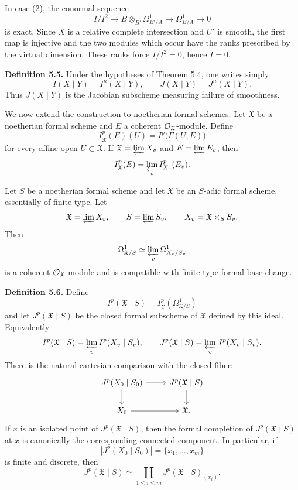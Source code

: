 \documentclass[11pt]{article}
\begin{document}
In case (2), the conormal sequence
\[
        I/I^2\longrightarrow
        B\otimes_{B'}\Omega^1_{B'/A}
        \longrightarrow
        \Omega^1_{B/A}\longrightarrow 0
\]
is exact.  Since \(X\) is a relative complete intersection and \(U'\) is smooth, the first map is injective and the two modules which occur have the ranks prescribed by the virtual dimension.  These ranks force \(I/I^2=0\), hence \(I=0\).

\textbf{Definition 5.5.}  Under the hypotheses of Theorem 5.4, one writes simply
\[
        I(X\mid Y)=I^n(X\mid Y),\qquad
        J(X\mid Y)=J^n(X\mid Y).
\]
Thus \(J(X\mid Y)\) is the Jacobian subscheme measuring failure of smoothness.

We now extend the construction to noetherian formal schemes.  Let \(\mathfrak X\) be a noetherian formal scheme and \(E\) a coherent \(\mathcal O_{\mathfrak X}\)-module.  Define
\[
        I^p_{\mathfrak X}(E)(U)=I^p\bigl(\Gamma(U,E)\bigr)
\]
for every affine open \(U\subset\mathfrak X\).  If \(\mathfrak X=\varprojlim X_v\) and \(E=\varprojlim E_v\), then
\[
        I^p_{\mathfrak X}(E)=\varprojlim_v I^p_{X_v}(E_v).
\]

Let \(S\) be a noetherian formal scheme and let \(\mathfrak X\) be an \(S\)-adic formal scheme, essentially of finite type.  Let
\[
        \mathfrak X=\varprojlim X_v,\qquad S=\varprojlim S_v,\qquad
        X_v=\mathfrak X\times_S S_v.
\]
Then
\[
        \Omega^1_{\mathfrak X/S}\simeq \varprojlim_v\Omega^1_{X_v/S_v}
\]
is a coherent \(\mathcal O_{\mathfrak X}\)-module and is compatible with finite-type formal base change.

\textbf{Definition 5.6.}  Define
\[
        I^p(\mathfrak X\mid S)=I^p_{\mathfrak X}(\Omega^1_{\mathfrak X/S})
\]
and let \(J^p(\mathfrak X\mid S)\) be the closed formal subscheme of \(\mathfrak X\) defined by this ideal.  Equivalently
\[
        I^p(\mathfrak X\mid S)=\varprojlim_v I^p(X_v\mid S_v),
        \qquad
        J^p(\mathfrak X\mid S)=\varprojlim_v J^p(X_v\mid S_v).
\]
There is the natural cartesian comparison with the closed fiber:
\[
\begin{tikzcd}
J^p(X_0\mid S_0) \arrow[r] \arrow[d] &
J^p(\mathfrak X\mid S) \arrow[d]\\
X_0 \arrow[r] & \mathfrak X .
\end{tikzcd}
\]
If \(x\) is an isolated point of \(J^p(\mathfrak X\mid S)\), then the formal completion of \(J^p(\mathfrak X\mid S)\) at \(x\) is canonically the corresponding connected component.  In particular, if
\[
        |J^p(X_0\mid S_0)|=\{x_1,\ldots,x_m\}
\]
is finite and discrete, then
\[
        J^p(\mathfrak X\mid S)
        \simeq
        \coprod_{1\leq i\leq m} J^p(\mathfrak X\mid S)_{(x_i)}.
\]
\end{document}
